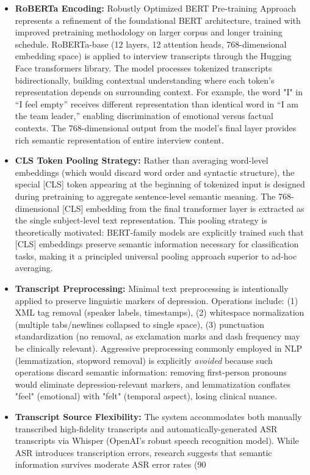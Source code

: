 \documentclass[12pt]{article}
\begin{document}
	\begin{itemize}
		\item \textbf{RoBERTa Encoding:} Robustly Optimized BERT Pre-training Approach represents a refinement of the foundational BERT architecture, trained with improved pretraining methodology on larger corpus and longer training schedule. RoBERTa-base (12 layers, 12 attention heads, 768-dimensional embedding space) is applied to interview transcripts through the Hugging Face transformers library. The model processes tokenized transcripts bidirectionally, building contextual understanding where each token's representation depends on surrounding context. For example, the word "I" in ``I feel empty'' receives different representation than identical word in ``I am the team leader,'' enabling discrimination of emotional versus factual contexts. The 768-dimensional output from the model's final layer provides rich semantic representation of entire interview content.

		\item \textbf{CLS Token Pooling Strategy:} Rather than averaging word-level embeddings (which would discard word order and syntactic structure), the special [CLS] token appearing at the beginning of tokenized input is designed during pretraining to aggregate sentence-level semantic meaning. The 768-dimensional [CLS] embedding from the final transformer layer is extracted as the single subject-level text representation. This pooling strategy is theoretically motivated: BERT-family models are explicitly trained such that [CLS] embeddings preserve semantic information necessary for classification tasks, making it a principled universal pooling approach superior to ad-hoc averaging.

		\item \textbf{Transcript Preprocessing:} Minimal text preprocessing is intentionally applied to preserve linguistic markers of depression. Operations include: (1) XML tag removal (speaker labels, timestamps), (2) whitespace normalization (multiple tabs/newlines collapsed to single space), (3) punctuation standardization (no removal, as exclamation marks and dash frequency may be clinically relevant). Aggressive preprocessing commonly employed in NLP (lemmatization, stopword removal) is explicitly \textit{avoided} because such operations discard semantic information: removing first-person pronouns would eliminate depression-relevant markers, and lemmatization conflates "feel" (emotional) with "felt" (temporal aspect), losing clinical nuance.

		\item \textbf{Transcript Source Flexibility:} The system accommodates both manually transcribed high-fidelity transcripts and automatically-generated ASR transcripts via Whisper (OpenAI's robust speech recognition model). While ASR introduces transcription errors, research suggests that semantic information survives moderate ASR error rates (90%
	\end{itemize}
\end{document}
